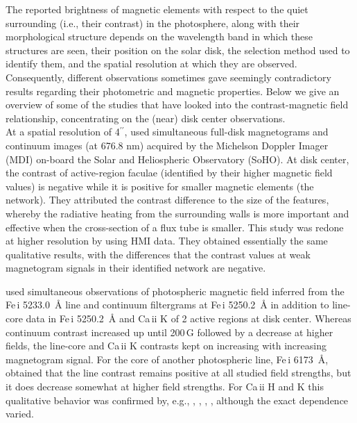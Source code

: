 \documentclass[goettingen, gauss, print]{thesis}
\begin{document}
The reported brightness of magnetic elements with respect to the quiet surrounding (i.e., their contrast) in the photosphere, along with their morphological structure depends on the wavelength band in which these structures are seen, their position on the solar disk, the selection method used to identify them, and the spatial resolution at which they are observed. Consequently, different observations sometimes gave seemingly contradictory results regarding their photometric and magnetic properties.
Below we give an overview of some of the studies that have looked into the contrast-magnetic field relationship, concentrating on the (near) disk center observations.\\

At a spatial resolution of 4$^{\prime\prime}$, \citet{ortiz_intensity_2002} used simultaneous full-disk magnetograms and continuum images (at 676.8 nm) acquired by the Michelson Doppler Imager (MDI) on-board the Solar and Heliospheric Observatory (SoHO). At disk center, the contrast of active-region faculae (identified by their higher magnetic field values) is negative while it is positive for smaller magnetic elements (the network). They attributed the contrast difference to the size of the features, whereby the radiative heating from the surrounding walls is more important and effective when the cross-section of a flux tube is smaller. This study was redone at higher resolution by \cite{yeo_intensity_2013} using HMI data. They obtained essentially the same qualitative results, with the differences that the contrast values at weak magnetogram signals in their identified network are negative.

\citet{frazier_multi-channel_1971} used simultaneous observations of photospheric magnetic field inferred from the Fe\,{\sc i} 5233.0\, \AA{} line and continuum filtergrams at Fe\,{\sc i} 5250.2\, \AA{} in addition to line-core data in Fe\,{\sc i} 5250.2\, \AA{} and Ca\,{\sc ii} K of 2 active regions at disk center. Whereas continuum contrast increased up until 200\,G followed by a decrease at higher fields, the line-core and Ca\,{\sc ii} K contrasts kept on increasing with increasing magnetogram signal. For the core of another photospheric line, Fe\,{\sc i} 6173\, \AA{}, \cite{yeo_intensity_2013} obtained that the line contrast remains positive at all studied field strengths, but it does decrease somewhat at higher field strengths. For Ca\,{\sc ii} H and K this qualitative behavior was confirmed by, e.g., \cite{skumanich_statistical_1975}, \cite{schrijver_relations_1989}, \cite{loukitcheva_relationship_2009}, \cite{kahil_brightness_2017}, although the exact dependence varied. 
\end{document}
